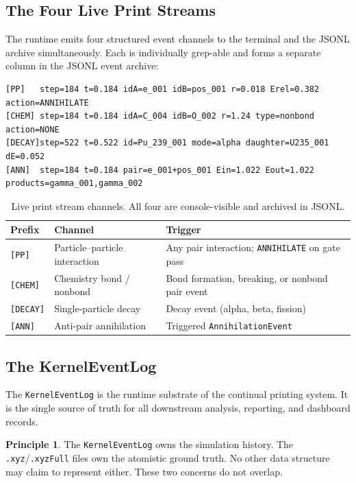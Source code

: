 \documentclass[11pt,a4paper]{article}
\theoremstyle{definition}
\newtheorem{principle}{Principle}[section]
\begin{document}
\subsection{The Four Live Print Streams}

The runtime emits four structured event channels to the terminal and the
JSONL archive simultaneously.  Each is individually grep-able and forms a
separate column in the JSONL event archive:

\begin{lstlisting}[style=eventprint,
  caption={Representative output from all four live print channels.}]
[PP]   step=184 t=0.184 idA=e_001 idB=pos_001 r=0.018 Erel=0.382 action=ANNIHILATE
[CHEM] step=184 t=0.184 idA=C_004 idB=O_002 r=1.24 type=nonbond action=NONE
[DECAY]step=522 t=0.522 id=Pu_239_001 mode=alpha daughter=U235_001 dE=0.052
[ANN]  step=184 t=0.184 pair=e_001+pos_001 Ein=1.022 Eout=1.022 products=gamma_001,gamma_002
\end{lstlisting}

\begin{table}[H]
\centering
\small
\begin{tabular}{@{}llp{7cm}@{}}
\toprule
Prefix & Channel & Trigger \\
\midrule
\texttt{[PP]}    & Particle--particle interaction
  & Any pair interaction; \texttt{ANNIHILATE} on gate pass \\
\texttt{[CHEM]}  & Chemistry bond / nonbond
  & Bond formation, breaking, or nonbond pair event \\
\texttt{[DECAY]} & Single-particle decay
  & Decay event (alpha, beta, fission) \\
\texttt{[ANN]}   & Anti-pair annihilation
  & Triggered \texttt{AnnihilationEvent} \\
\bottomrule
\end{tabular}
\caption{Live print stream channels. All four are console-visible and archived in JSONL.}
\end{table}

\subsection{The KernelEventLog}

The \texttt{KernelEventLog} is the runtime substrate of the continual printing
system.  It is the single source of truth for all downstream analysis,
reporting, and dashboard records.

\begin{principle}
  The \texttt{KernelEventLog} owns the simulation history.  The
  \texttt{.xyz}/\texttt{.xyzFull} files own the atomistic ground truth.
  No other data structure may claim to represent either.  These two
  concerns do not overlap.
\end{principle}
\end{document}
